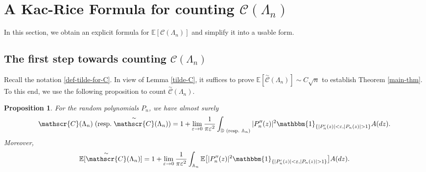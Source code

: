 \documentclass[9pt,a4paper,reqno]{amsart}
\newcommand{\tildea}[1]{\overset{\sim}{#1}}
\theoremstyle{mine}
\newtheorem{prop}[thm]{Proposition}
\theoremstyle{definition}
\theoremstyle{remark}
\renewcommand\epsilon{\varepsilon}
\newcommand{\mb}{\mathbb}
\begin{document}
\section{A Kac-Rice Formula for counting \texorpdfstring{${\mathscr{C}}(\Lambda_n)$}{C tilde(Lambda n)}}

In this section, we obtain an explicit formula for $\mb{E}[\mathscr{C}(\Lambda_n)]$ and simplify it into a usable form.  

\subsection{The first step towards counting \texorpdfstring{${\mathscr{C}}(\Lambda_n)$}{C tilde(Lambda n)}}
Recall the notation \eqref{def-tilde-for-C}. In view of Lemma \ref{tilde-C}, it suffices to prove $\mb{E}[\tildea{\mathscr{C}}(\Lambda_n)] \sim C\sqrt{n}$ to establish Theorem \ref{main-thm}. To this end, we use the following proposition to count $\tildea{\mathscr{C}}(\Lambda_n)$.  



\begin{prop}\label{Kac-Rice Formula}
 For the random polynomials $P_n$, we have almost surely 
    \begin{equation}\label{C-Formula}
        \mathscr{C}(\Lambda_n) \hspace{1mm}(\textrm{resp.} \hspace{1mm} \tildea{\mathscr{C}}(\Lambda_n) ) = 1 + \lim_{\epsilon \to 0} \frac{1}{\pi \epsilon^2} \int_{\mb{D} \hspace{1mm}(\textrm{resp.} \hspace{1mm} \mb{A}_n )} |P_n''(z)|^2 \mathbbm{1}_{\{|P_n'(z)|<\epsilon, |P_n(z)| >1\}} A(dz). 
    \end{equation} 
   Moreover, 
   \begin{equation}\label{exp-tilde-C}
       \mb{E}[\tildea{\mathscr{C}}(\Lambda_n)] = 1 + \lim_{\epsilon \to 0} \frac{1}{\pi \epsilon^2} \int_{\mb{A}_n} \mb{E}\bigl[|P_n''(z)|^2 \mathbbm{1}_{\{|P_n'(z)|<\epsilon, |P_n(z)| >1\}}\bigr] A(dz).
   \end{equation}  
\end{prop}
\end{document}
